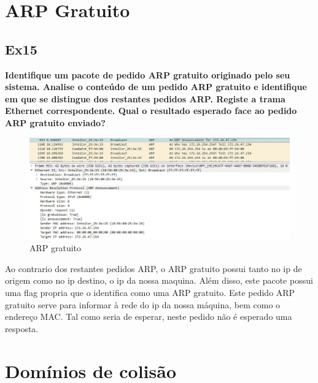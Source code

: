 \documentclass{article}
\begin{document}
\section{ARP Gratuito}
\subsection{Ex15}
\textbf{Identifique um pacote de pedido ARP gratuito originado pelo seu sistema. Analise o conteúdo de um pedido ARP gratuito e identifique em que se distingue dos restantes pedidos ARP. Registe a trama Ethernet correspondente. Qual o resultado esperado face ao pedido ARP gratuito enviado?}\\\par

\begin{figure}[h]
	\centering
	\includegraphics[scale = 0.6]{ex-15.png}
	\caption{ARP gratuito}
\end{figure}


Ao contrario dos restantes pedidos ARP, o ARP gratuito possui tanto no ip de origem como no ip destino, o ip da nossa maquina. Além disso, este pacote possui uma flag propria que o identifica como uma ARP gratuito. Este pedido ARP gratuito serve para informar à rede do ip da nossa máquina, bem como o endereço MAC. Tal como seria de esperar, neste pedido não é esperado uma resposta.

\section{Domínios de colisão}
\end{document}
